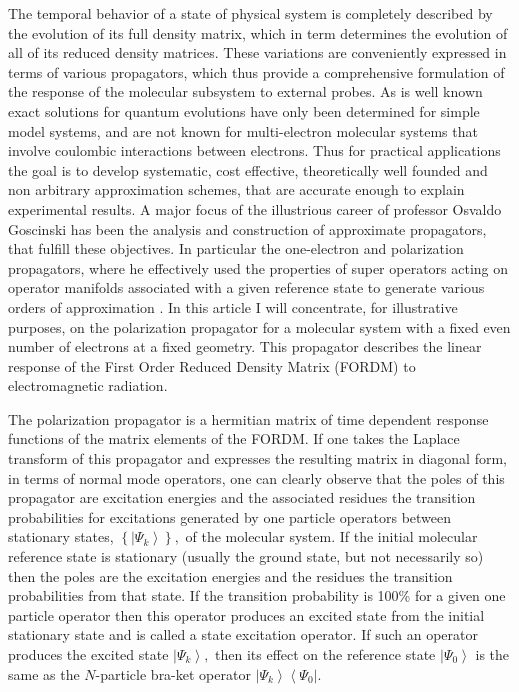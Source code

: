 \documentclass[12pt,aps,amsfonts,amssymb,tightenlines]{revtex4}%
\begin{document}
The temporal behavior of a state of physical system is completely described by
the evolution of its full density matrix, which in term determines the
evolution of all of its reduced density matrices. These variations are
conveniently expressed in terms of various propagators, which thus provide a
comprehensive formulation of the response of the molecular subsystem to
external probes. As is well known exact solutions for quantum evolutions have
only been determined for simple model systems, and are not known for
multi-electron molecular systems that involve coulombic interactions between
electrons. Thus for practical applications the goal is to develop systematic,
cost effective, theoretically well founded and non arbitrary approximation
schemes, that are accurate enough to explain experimental results. A major
focus of the illustrious career of professor Osvaldo Goscinski has been the
analysis and construction of approximate propagators, that fulfill these
objectives. In particular the one-electron and polarization propagators, where
he effectively used the properties of super operators acting on operator
manifolds associated with a given reference state to generate various orders
of approximation \cite{Goscinski73}\cite{Pickup73}\cite{Goscinski69}%
\cite{Goscinski70}\cite{Weiner80a}\cite{Goscinski80}\cite{Howat77a}. In this
article I will concentrate, for illustrative purposes, on the polarization
propagator for a molecular system with a fixed even number of electrons at a
fixed geometry. This propagator describes the linear response of the First
Order Reduced Density Matrix (FORDM) to electromagnetic radiation.

The polarization propagator is a hermitian matrix of time dependent response
functions of the matrix elements of the FORDM. If one takes the Laplace
transform of this propagator and expresses the resulting matrix in diagonal
form, in terms of normal mode operators, one can clearly observe that the
poles of this propagator are excitation energies and the associated residues
the transition probabilities for excitations generated by one particle
operators between stationary states, $\left\{  \left\vert \Psi_{k}%
\right\rangle \right\}  ,$ of the molecular system. If the initial molecular
reference state is stationary (usually the ground state, but not necessarily
so) then the poles are the excitation energies and the residues the transition
probabilities from that state. If the transition probability is 100\% for a
given one particle operator then this operator produces an excited state from
the initial stationary state and is called a state excitation operator. If
such an operator produces the excited state $\left\vert \Psi_{k}\right\rangle
,$ then its effect on the reference state $\left\vert \Psi_{0}\right\rangle $
is the same as the $N$-particle bra-ket operator $\left\vert \Psi
_{k}\right\rangle \left\langle \Psi_{0}\right\vert .$
\end{document}
